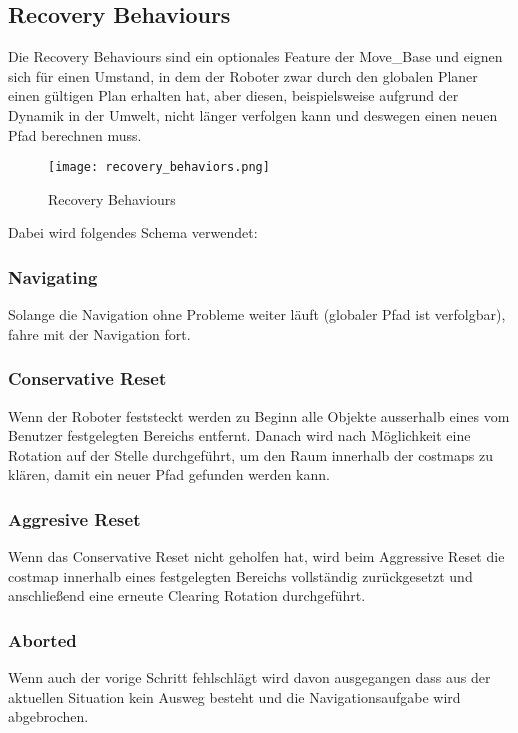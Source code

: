 \documentclass[oribibl]{llncs}
\begin{document}
\subsection{Recovery Behaviours} \label{recoveryBehaviours}
Die Recovery Behaviours sind ein optionales Feature der Move\_Base und eignen sich für einen Umstand, in dem der Roboter zwar durch den globalen Planer einen gültigen Plan erhalten hat, aber diesen, beispielsweise aufgrund der Dynamik in der Umwelt, nicht länger verfolgen kann und deswegen einen neuen Pfad berechnen muss.\\
\begin{figure}
	\centering
  \texttt{[image: recovery\_behaviors.png]}
	\caption{Recovery Behaviours}
	\cite{recoveryBehavioursImage}
\end{figure}

Dabei wird folgendes Schema verwendet:\cite{recoveryBehaviours}
\subsubsection{Navigating} Solange die Navigation ohne Probleme weiter läuft (globaler Pfad ist verfolgbar), fahre mit der Navigation fort.
\subsubsection{Conservative Reset} Wenn der Roboter feststeckt werden zu Beginn alle Objekte ausserhalb eines vom Benutzer festgelegten Bereichs entfernt. Danach wird nach Möglichkeit eine Rotation auf der Stelle durchgeführt, um den Raum innerhalb der costmaps zu klären, damit ein neuer Pfad gefunden werden kann.
\subsubsection{Aggresive Reset} Wenn das Conservative Reset nicht geholfen hat, wird beim Aggressive Reset die costmap innerhalb eines festgelegten Bereichs vollständig zurückgesetzt und anschließend eine erneute Clearing Rotation durchgeführt.
\subsubsection{Aborted} Wenn auch der vorige Schritt fehlschlägt wird davon ausgegangen dass aus der aktuellen Situation kein Ausweg besteht und die Navigationsaufgabe wird abgebrochen.
\end{document}
